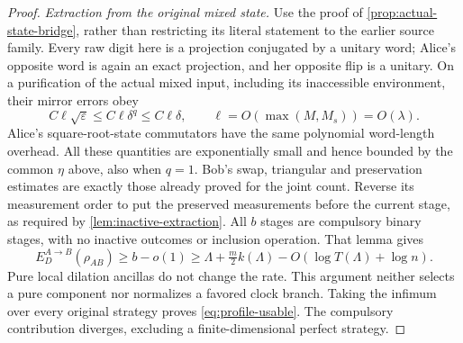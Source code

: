 \begin{proof}
\par\smallskip\noindent\textit{Extraction from the original mixed state.}\quad
Use the proof of \cref{prop:actual-state-bridge}, rather than restricting its literal statement to the earlier source family. Every raw digit here is a projection conjugated by a unitary word; Alice's opposite word is again an exact projection, and her opposite flip is a unitary. On a purification of the actual mixed input, including its inaccessible environment, their mirror errors obey
\begin{equation}\label{eq:profile-mirror-budget}
 C\ell\sqrt\varepsilon\le C\ell\delta^q\le C\ell\delta,
 \qquad \ell=O(\max(M,M_s))=O(\lambda).
\end{equation}
Alice's square-root-state commutators have the same polynomial word-length overhead. All these quantities are exponentially small and hence bounded by the common $\eta$ above, also when $q=1$. Bob's swap, triangular and preservation estimates are exactly those already proved for the joint count. Reverse its measurement order to put the preserved measurements before the current stage, as required by \cref{lem:inactive-extraction}. All $b$ stages are compulsory binary stages, with no inactive outcomes or inclusion operation. That lemma gives
\[
 E_D^{A\to B}(\rho_{AB})\ge b-o(1)
 \ge\Lambda+\tfrac m2k(\Lambda)-O(\log T(\Lambda)+\log n).
\]
Pure local dilation ancillas do not change the rate. This argument neither selects a pure component nor normalizes a favored clock branch. Taking the infimum over every original strategy proves \eqref{eq:profile-usable}. The compulsory contribution diverges, excluding a finite-dimensional perfect strategy.
\end{proof}
